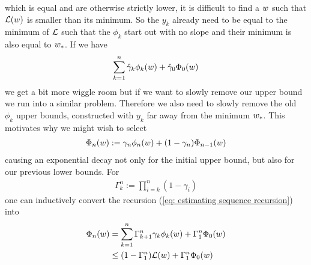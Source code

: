 which is equal and are otherwise strictly lower, it is difficult to find
a \(w\) such that \(\mathcal{L}(w)\) is smaller than its minimum.
So the \(y_k\) already need to be equal to the minimum
of \(\mathcal{L}\) such that the \(\phi_k\) start out with no slope and their
minimum is also equal to \(w_*\). If we have
\begin{align*}
	\sum_{k=1}^n \hat{\gamma}_k \phi_k(w)
	+ \hat{\gamma}_0 \Phi_0(w)
\end{align*}
we get a bit more wiggle room but if we want to slowly remove our upper bound
we run into a similar problem. Therefore we also need to slowly remove the old
\(\phi_k\) upper bounds, constructed with \(y_k\) far away from the minimum
\(w_*\). This motivates why we might wish to select
\begin{align}\label{eq: estimating sequence recursion}
	\Phi_n(w) := \gamma_n \phi_n(w) + (1-\gamma_n)\Phi_{n-1}(w)
\end{align}
causing an exponential decay not only for the initial upper bound, but also for
our previous lower bounds. For
\begin{align*}
	\Gamma_k^n := \prod_{i=k}^n (1-\gamma_i)
\end{align*}
one can inductively convert the recursion (\ref{eq: estimating sequence
recursion}) into
\begin{align}
	\nonumber
	\Phi_n(w)
	&= \sum_{k=1}^n \Gamma_{k+1}^n\gamma_k \phi_k(w)
	+ \Gamma_1^n\Phi_0(w) \\
	\label{eq: estimating sequence explicit}
	&\le (1-\Gamma_1^n)\mathcal{L}(w) + \Gamma_1^n\Phi_0(w)
\end{align}

